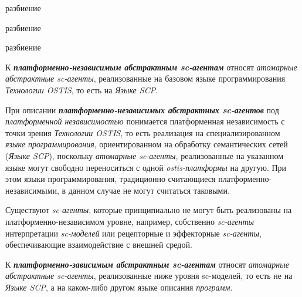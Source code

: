 \begin{SCn}
\begin{scnrelfromset}{разбиение}
\end{scnrelfromset}

\begin{scnrelfromset}{разбиение}
\end{scnrelfromset}	

\begin{scnrelfromset}{разбиение}
\end{scnrelfromset}	
\end{SCn}

К \textbf{\textit{платформенно-независимым абстрактным \mbox{sc-агентам}}} относят \textit{атомарные абстрактные sc-агенты}, реализованные на базовом языке программирования \textit{Технологии OSTIS}, то есть на \textit{Языке SCP}.

При описании \textbf{\textit{платформенно-независимых абстрактных sc-агентов}} под \textit{платформенной независимостью} понимается платформенная независимость с точки зрения \textit{Технологии OSTIS}, то есть реализация на специализированном \textit{языке программирования}, ориентированном на обработку семантических сетей (\textit{Языке SCP}), поскольку \textit{атомарные sc-агенты}, реализованные на указанном языке могут свободно переноситься с одной \textit{ostis-платформы} на другую. При этом языки программирования, традиционно считающиеся платформенно-независимыми, в данном случае не могут считаться таковыми.

Существуют \textit{sc-агенты}, которые принципиально не могут быть реализованы на платформенно-независимом уровне, например, собственно \textit{sc-агенты} интерпретации \textit{sc-моделей} или рецепторные и эффекторные \textit{sc-агенты}, обеспечивающие взаимодействие с внешней средой.

К \textbf{\textit{платформенно-зависимым абстрактным sc-агентам}} относят \textit{атомарные абстрактные sc-агенты}, реализованные ниже уровня sc-моделей, то есть не на \textit{Языке SCP}, а на каком-либо другом языке описания \textit{программ}.

